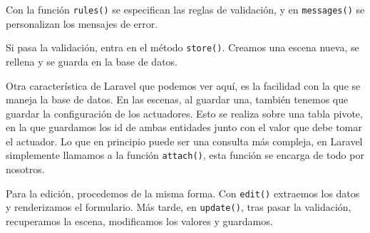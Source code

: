   Con la función \lstinline|rules()| se especifican las reglas de validación, y en \lstinline|messages()| se personalizan los mensajes de error.
   
   Si pasa la validación, entra en el método \lstinline|store()|. Creamos una escena nueva, se rellena y se guarda en  la base de datos.
   
   Otra característica de Laravel que podemos ver aquí, es la facilidad con la que se maneja la base de datos. En las escenas, al guardar una, también tenemos que guardar la configuración de los actuadores. Esto se realiza sobre una tabla pivote, en la que guardamos los id de ambas entidades junto con el valor que debe tomar el actuador. Lo que en principio puede ser una consulta más compleja, en Laravel simplemente llamamos a la función \lstinline|attach()|, esta función se encarga de todo por nosotros.
   
   Para la edición, procedemos de la misma forma. Con \lstinline|edit()| extraemos los datos y renderizamos el formulario. Más tarde, en \lstinline|update()|, tras pasar la validación, recuperamos la escena, modificamos los valores y guardamos.
   
